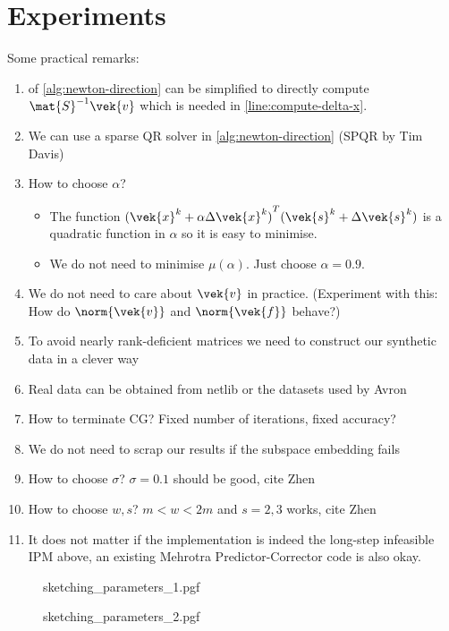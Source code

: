 \chapter{Experiments}\label{chap:experiments}

Some practical remarks:
\begin{enumerate}
  \item {} of \cref{alg:newton-direction} can be simplified to directly compute \(\mat{S}^{-1}\vek{v}\) which is needed in \cref{line:compute-delta-x}.
  \item We can use a sparse QR solver in \cref{alg:newton-direction} (SPQR by Tim Davis)
  \item How to choose \(\alpha\)?
  \begin{itemize}
    \item The function \({(\vek{x}^k + \alpha \Delta\vek{x}^k)}^T (\vek{s}^k + \Delta\vek{s}^k)\) is a quadratic function in \(\alpha\) so it is easy to minimise.
    \item We do not need to minimise \(\mu(\alpha)\). Just choose \(\alpha = 0.9\).
  \end{itemize}
  \item We do not need to care about \(\vek{v}\) in practice. (Experiment with this: How do \(\norm{\vek{v}}\) and \(\norm{\vek{f}}\) behave?)
  \item To avoid nearly rank-deficient matrices we need to construct our synthetic data in a clever way
  \item Real data can be obtained from netlib or the datasets used by Avron
  \item How to terminate CG\@? Fixed number of iterations, fixed accuracy?
  \item We do not need to scrap our results if the subspace embedding fails
  \item How to choose \(\sigma\)? \(\sigma = 0.1\) should be good, cite Zhen
  \item How to choose \(w, s\)? \(m < w < 2m\) and \(s = 2, 3\) works, cite Zhen
  \item It does not matter if the implementation is indeed the long-step infeasible IPM above, an existing Mehrotra Predictor-Corrector code is also okay.
\end{enumerate}

\begin{figure}[h]
  \centering
  {sketching_parameters_1.pgf}
\end{figure}

\begin{figure}[h]
  \centering
  {sketching_parameters_2.pgf}
\end{figure}